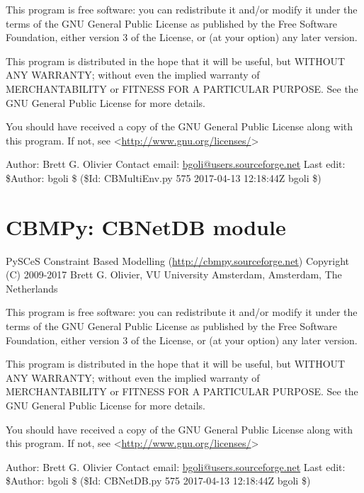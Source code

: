 \documentclass[a4paper,11pt,english]{sphinxmanual}
\begin{document}
This program is free software: you can redistribute it and/or modify
it under the terms of the GNU General Public License as published by
the Free Software Foundation, either version 3 of the License, or
(at your option) any later version.

This program is distributed in the hope that it will be useful,
but WITHOUT ANY WARRANTY; without even the implied warranty of
MERCHANTABILITY or FITNESS FOR A PARTICULAR PURPOSE.  See the
GNU General Public License for more details.

You should have received a copy of the GNU General Public License
along with this program.  If not, see \textless{}\url{http://www.gnu.org/licenses/}\textgreater{}

Author: Brett G. Olivier
Contact email: \href{mailto:bgoli@users.sourceforge.net}{bgoli@users.sourceforge.net}
Last edit: \$Author: bgoli \$ (\$Id: CBMultiEnv.py 575 2017-04-13 12:18:44Z bgoli \$)
\label{modules_doc:module-cbmpy.CBNetDB}

\section{CBMPy: CBNetDB module}
\label{modules_doc:cbmpy-cbnetdb-module}
PySCeS Constraint Based Modelling (\url{http://cbmpy.sourceforge.net})
Copyright (C) 2009-2017 Brett G. Olivier, VU University Amsterdam, Amsterdam, The Netherlands

This program is free software: you can redistribute it and/or modify
it under the terms of the GNU General Public License as published by
the Free Software Foundation, either version 3 of the License, or
(at your option) any later version.

This program is distributed in the hope that it will be useful,
but WITHOUT ANY WARRANTY; without even the implied warranty of
MERCHANTABILITY or FITNESS FOR A PARTICULAR PURPOSE.  See the
GNU General Public License for more details.

You should have received a copy of the GNU General Public License
along with this program.  If not, see \textless{}\url{http://www.gnu.org/licenses/}\textgreater{}

Author: Brett G. Olivier
Contact email: \href{mailto:bgoli@users.sourceforge.net}{bgoli@users.sourceforge.net}
Last edit: \$Author: bgoli \$ (\$Id: CBNetDB.py 575 2017-04-13 12:18:44Z bgoli \$)
\end{document}
